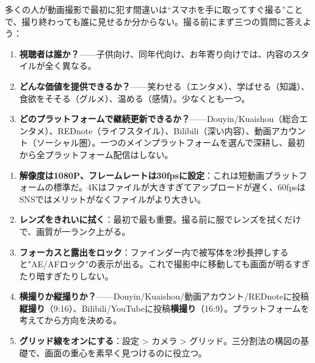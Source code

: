 


多くの人が動画撮影で最初に犯す間違いは“スマホを手に取ってすぐ撮る”ことで、撮り終わっても誰に見せるか分からない。撮る前にまず三つの質問に答えよう：

\begin{enumerate}
  \item \textbf{視聴者は誰か？}——子供向け、同年代向け、お年寄り向けでは、内容のスタイルが全く異なる。
  \item \textbf{どんな価値を提供できるか？}——笑わせる（エンタメ）、学ばせる（知識）、食欲をそそる（グルメ）、温める（感情）。少なくとも一つ。
  \item \textbf{どのプラットフォームで継続更新できるか？}——Douyin/Kuaishou（総合エンタメ）、REDnote（ライフスタイル）、Bilibili（深い内容）、動画アカウント（ソーシャル圏）。一つのメインプラットフォームを選んで深耕し、最初から全プラットフォーム配信はしない。
\end{enumerate}


\begin{enumerate}
  \item \textbf{解像度は1080P、フレームレートは30fpsに設定}：これは短動画プラットフォームの標準だ。4Kはファイルが大きすぎてアップロードが遅く、60fpsはSNSではメリットがなくファイルがより大きい。
  \item \textbf{レンズをきれいに拭く}：最初で最も重要。撮る前に服でレンズを拭くだけで、画質が一ランク上がる。
  \item \textbf{フォーカスと露出をロック}：ファインダー内で被写体を2秒長押しすると"AE/AFロック"の表示が出る。これで撮影中に移動しても画面が明るすぎたり暗すぎたりしない。
  \item \textbf{横撮りか縦撮りか？}——Douyin/Kuaishou/動画アカウント/REDnoteに投稿\textbf{縦撮り}（9:16）、Bilibili/YouTubeに投稿\textbf{横撮り}（16:9）。プラットフォームを考えてから方向を決める。
  \item \textbf{グリッド線をオンにする}：設定 > カメラ > グリッド。三分割法の構図の基礎で、画面の重心を素早く見つけるのに役立つ。
\end{enumerate}


